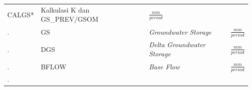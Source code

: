 \documentclass[11pt]{article}
\begin{document}
\begin{longtable}[]{@{}lllc@{}}
\begin{minipage}[t]{0.22\columnwidth}
CALGS*\strut
\end{minipage} & \begin{minipage}[t]{0.22\columnwidth}\raggedright
Kalkulasi K dan GS\_PREV/GSOM\strut
\end{minipage} & \begin{minipage}[t]{0.22\columnwidth}\centering
\(\frac{mm}{period}\)\strut
\end{minipage}\tabularnewline
\begin{minipage}[t]{0.22\columnwidth}\raggedright
.\strut
\end{minipage} & \begin{minipage}[t]{0.22\columnwidth}\raggedright
GS\strut
\end{minipage} & \begin{minipage}[t]{0.22\columnwidth}\raggedright
\emph{Groundwater Storage}\strut
\end{minipage} & \begin{minipage}[t]{0.22\columnwidth}\centering
\(\frac{mm}{period}\)\strut
\end{minipage}\tabularnewline
\begin{minipage}[t]{0.22\columnwidth}\raggedright
.\strut
\end{minipage} & \begin{minipage}[t]{0.22\columnwidth}\raggedright
DGS\strut
\end{minipage} & \begin{minipage}[t]{0.22\columnwidth}\raggedright
\emph{Delta Groundwater Storage}\strut
\end{minipage} & \begin{minipage}[t]{0.22\columnwidth}\centering
\(\frac{mm}{period}\)\strut
\end{minipage}\tabularnewline
\begin{minipage}[t]{0.22\columnwidth}\raggedright
.\strut
\end{minipage} & \begin{minipage}[t]{0.22\columnwidth}\raggedright
BFLOW\strut
\end{minipage} & \begin{minipage}[t]{0.22\columnwidth}\raggedright
\emph{Base Flow}\strut
\end{minipage} & \begin{minipage}[t]{0.22\columnwidth}\centering
\(\frac{mm}{period}\)\strut
\end{minipage}\tabularnewline
\begin{minipage}[t]{0.22\columnwidth}\raggedright
.\strut
\end{minipage} & \begin{minipage}[t]{0.22\columnwidth}\raggedright

\end{minipage}
\end{longtable}
\end{document}
